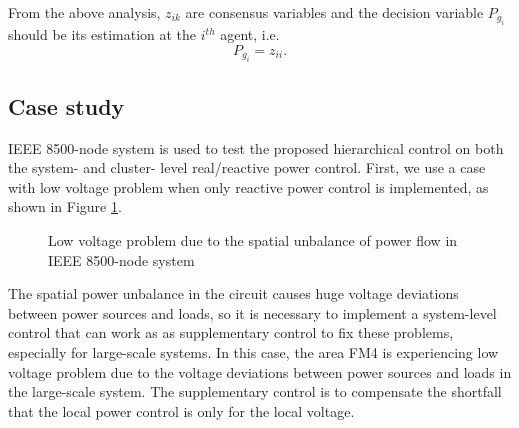 \documentclass{article}
\begin{document}
From the above analysis, $z_{ik}$ are consensus variables and the decision variable $P_{g_i}$ should be its estimation at the $i^{th}$ agent, i.e.
\begin{equation}
    P_{g_i} = z_{ii}.
\end{equation}

\subsection{Case study}

IEEE 8500-node system is used to test the proposed hierarchical control on both the system- and cluster- level real/reactive power control. First, we use a case with low voltage problem when only reactive power control is implemented, as shown in Figure \ref{fig:lowvolt}.  
\begin{figure}[ht]
    \centering
\centering
    \centering
    \caption{Low voltage problem due to the spatial unbalance of power flow in IEEE 8500-node system}
    \label{fig:lowvolt}
\end{figure}
The spatial power unbalance in the circuit causes huge voltage deviations between power sources and loads, so it is necessary to implement a system-level control that can work as as supplementary control to fix these problems, especially for large-scale systems. In this case, the area FM4 is experiencing low voltage problem due to the voltage deviations between power sources and loads in the large-scale system. The supplementary control is to compensate the shortfall that the local power control is only for the local voltage.
\end{document}
